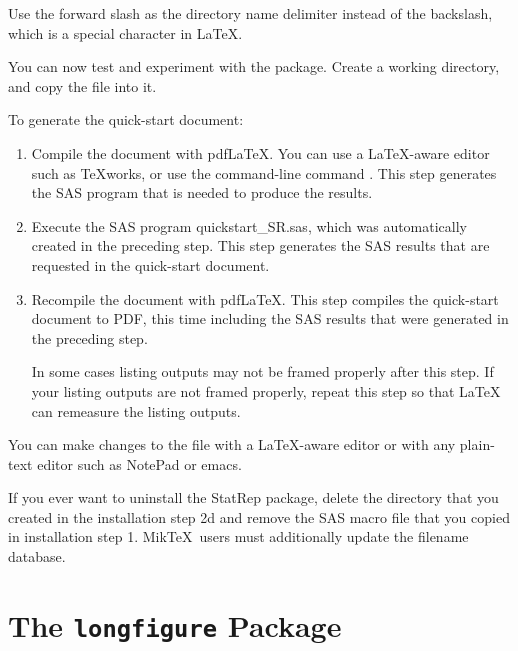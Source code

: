 \documentclass[article,oneside]{memoir}
\newcommand*{\StatRep}{\textsf{StatRep}\xspace}
\begin{document}
   Use the forward slash
   as the directory name delimiter instead of the backslash, which is a special
   character in LaTeX.

   You can now test and experiment with the package. Create a working
   directory, and copy the file  into it.

   To generate the quick-start document:
\begin{enumerate}
\item Compile the document with pdf\LaTeX. You can use a \LaTeX-aware
      editor such as \TeX works, or use the command-line command .
      This step generates the SAS program that is needed to produce the results.

\item Execute the SAS program quickstart\_SR.sas, which was automatically
      created in the preceding step. This step generates the SAS
      results that are requested in the quick-start document.
      

\item Recompile the document with pdf\LaTeX. This step compiles the
      quick-start document to PDF, this time including the SAS results
      that were generated in the preceding step.

      In some cases listing outputs may not be framed properly after this step.
      If your listing outputs are not framed properly, repeat this step so that 
      LaTeX can remeasure the listing outputs.

\end{enumerate}
   You can make changes to the file with a \LaTeX-aware editor
   or with any plain-text editor such as \textsf{NotePad} or \textsf{emacs}.

If you ever want to uninstall the \StatRep package,
delete the  directory that you created
in the installation step 2d and remove the SAS macro file 
that you copied in installation step 1.
   Mik\TeX\ users must additionally update the filename database.\\
   
\section{The \texttt{longfigure} Package}\label{longfigure}
 
\end{document}
